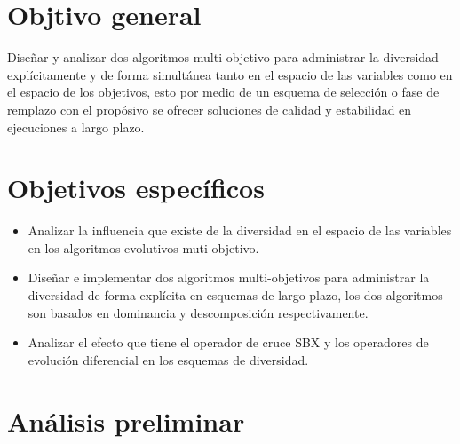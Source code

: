 
\section{Objtivo general}

Diseñar y analizar dos algoritmos multi-objetivo para administrar la diversidad explícitamente y de forma simultánea tanto en el espacio de las variables como en el espacio de los objetivos, esto por medio de un esquema de selección o fase de remplazo con el propósivo se ofrecer soluciones de calidad y estabilidad en ejecuciones a largo plazo.

\section{Objetivos específicos}

\begin{itemize}
\item Analizar la influencia que existe de la diversidad en el espacio de las variables en los algoritmos evolutivos muti-objetivo.
\item Diseñar e implementar dos algoritmos multi-objetivos para administrar la diversidad de forma explícita en esquemas de largo plazo, los dos algoritmos son basados en dominancia y descomposición respectivamente.
\item Analizar el efecto que tiene el operador de cruce SBX y los operadores de evolución diferencial en los esquemas de diversidad.
\end{itemize}

\section{Análisis preliminar}

